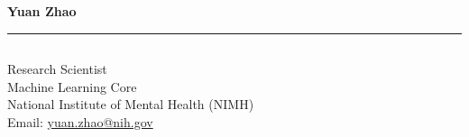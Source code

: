 \documentclass[11pt]{article}
\begin{document}
{\noindent\Large\textbf{Yuan Zhao}}\\
\hrule

\subsection*{}
Research Scientist \\
Machine Learning Core \\
National Institute of Mental Health (NIMH) \\
Email: \href{mailto:yuan.zhao@nih.gov}{yuan.zhao@nih.gov} \\


\end{document}
